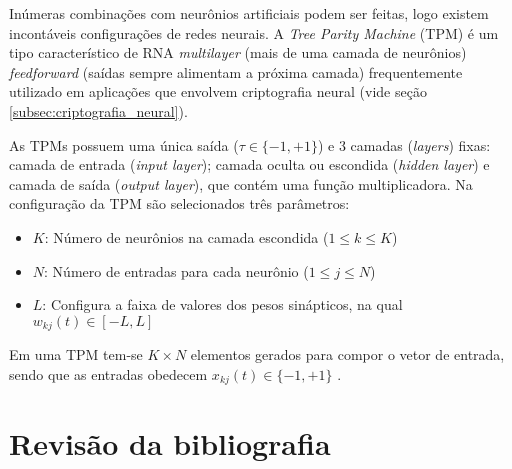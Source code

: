\documentclass[12pt]{article}
\begin{document}
            
            Inúmeras combinações com neurônios artificiais podem ser feitas, logo existem incontáveis configurações de redes neurais. A \textit{Tree Parity Machine} (TPM) é um tipo característico de RNA \textit{multilayer} (mais de uma camada de neurônios) \textit{feedforward} (saídas sempre alimentam a próxima camada) frequentemente utilizado em aplicações que envolvem criptografia neural (vide seção \ref{subsec:criptografia_neural}).
            
            As TPMs possuem uma única saída ($\tau \in \{-1,+1\}$) e 3 camadas (\textit{layers}) fixas: camada de entrada (\textit{input layer}); camada oculta ou escondida  (\textit{hidden layer}) e camada de saída (\textit{output layer}), que contém uma função multiplicadora. Na configuração da TPM são selecionados três parâmetros: 
            \begin{itemize}
                \item $K$: Número de neurônios na camada escondida ($1 \leq k \leq K$)
                \item $N$: Número de entradas para cada neurônio ($1 \leq j \leq N$)
                \item $L$: Configura a faixa de valores dos pesos sinápticos, na qual $w_{kj}(t) \in [-L,L]$
            \end{itemize}
            Em uma TPM tem-se $K \times N$ elementos gerados para compor o vetor de entrada, sendo que as entradas obedecem $x_{kj}(t) \in \{-1,+1\}$ \cite{volkmer2005tree}.
            
            
  
    \section{Revisão da bibliografia}
    \label{sec:revisao_da_bibliografia}
  
\end{document}
